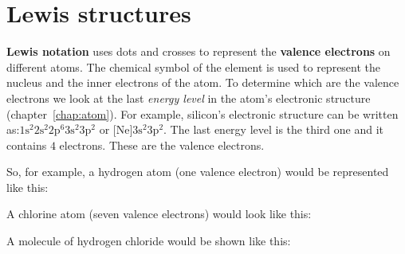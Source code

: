          \section{Lewis structures}
    \nopagebreak
      \label{m38701*id140105}\textbf{Lewis notation} uses dots and crosses to represent the \textbf{valence electrons} on different atoms. The chemical symbol of the element is used to represent the nucleus and the inner electrons of the atom. To determine which are the valence electrons we look at the last \textsl{energy level} in the atom's electronic structure (chapter~\ref{chap:atom}). For example, silicon's electronic structure can be written as:$1\text{s}^{2}2\text{s}^{2}2\text{p}^{6}3\text{s}^{2}3\text{p}^{2}$ or $\text{[Ne]}3\text{s}^{2}3\text{p}^{2}$. The last energy level is the third one and it contains $4$ electrons. These are the valence electrons.
 \par 
So, for example, a hydrogen atom (one valence electron) would be represented like this: 

A chlorine atom (seven valence electrons) would look like this:

A molecule of hydrogen chloride would be shown like this:
\begin{center}
\end{center}

